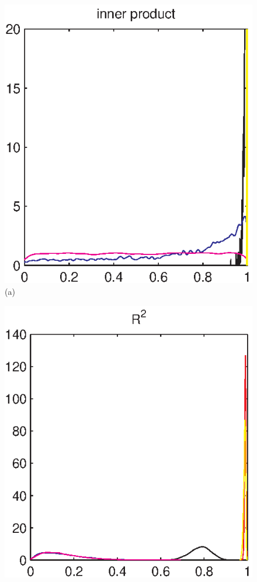 \documentclass[authoryear,preprint,12pt]{elsarticle}
\begin{document}
\begin{figure}[!htbp]
  \begin{center}
    \begin{minipage}[]{0.42\textwidth}
      \centering
      \includegraphics[width=\textwidth]{inner_product.eps}
      (a)
    \end{minipage}
    \begin{minipage}[]{0.42\textwidth}
      \centering
      \includegraphics[width=\textwidth]{R2.eps}

\end{minipage}
\end{center}
\end{figure}
\end{document}
